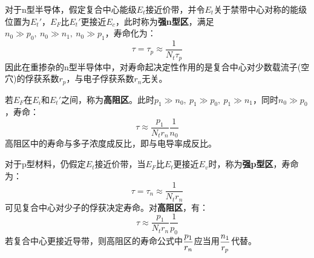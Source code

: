 对于n型半导体，假定复合中心能级$E_t$接近价带，并令$E_t$关于禁带中心对称的能级位置为$E_t'$，$E_F$比$E_t'$更接近$E_c$，此时称为\textbf{强n型区}，满足$n_0\gg p_0,\ n_0\gg n_1,\ n_0\gg p_1$，寿命化为：
\begin{equation}
    \tau=\tau_p\approx\frac{1}{N_t\tau_p}\label{eq:chap-5-indirect-recombination-n-type-strong-n-lifetime}
\end{equation}
因此在重掺杂的n型半导体中，对寿命起决定性作用的是复合中心对少数载流子(空穴)的俘获系数$r_p$，与电子俘获系数$r_n$无关。

若$E_F$在$E_i$和$E_t'$之间，称为\textbf{高阻区}。此时$p_1\gg n_0,\ p_1\gg p_0,\ p_1\gg n_1$，同时$n_0\gg p_0$，寿命：
\begin{equation}
    \tau\approx\frac{p_1}{N_tr_n}\frac{1}{n_0}
\end{equation}
高阻区中的寿命与多子浓度成反比，即与电导率成反比。

对于p型材料，仍假定$E_t$接近价带，当$E_F$比$E_t$更接近$E_v$时，称为\textbf{强p型区}，寿命为：
\begin{equation}
    \tau=\tau_n\approx\frac{1}{N_tr_n}\label{eq:chap-5-indirect-recombination-p-type-strong-p-lifetime}
\end{equation}
可见复合中心对少子的俘获决定寿命。对\textbf{高阻区}，有：
\begin{equation}
    \tau\approx\frac{p_1}{N_tr_n}\frac{1}{p_0}
\end{equation}
\vspace{1ex}若复合中心更接近导带，则高阻区的寿命公式中$\displaystyle\frac{p_1}{r_n}$应当用$\displaystyle \frac{n_1}{r_p}$代替。

